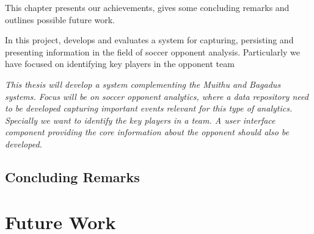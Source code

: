 This chapter presents our achievements, gives some concluding remarks and outlines possible future work.

In this project, develops and evaluates a system for capturing, persisting and presenting information in the field of soccer opponent analysis. Particularly we have focused on identifying key players in the opponent team 

\textit{This thesis will develop a system complementing the Muithu and Bagadus systems. Focus will be on soccer opponent analytics, where a data repository need to be developed capturing important events relevant for this type of analytics. Specially we want to identify the key players in a team. A user interface component providing the core information about the opponent should also be developed.}

\subsection{Concluding Remarks}


\section{Future Work}


